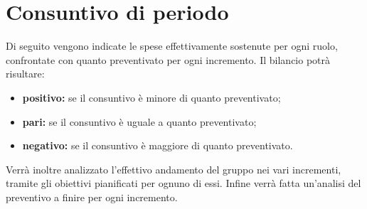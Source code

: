 \section{Consuntivo di periodo}

Di seguito vengono indicate le spese effettivamente sostenute per ogni ruolo, confrontate con quanto preventivato per ogni incremento. Il bilancio potrà risultare:

\begin{itemize}
\item \textbf{positivo:} se il consuntivo è minore di quanto preventivato;
\item \textbf{pari:} se il consuntivo è uguale a quanto preventivato;
\item \textbf{negativo:} se il consuntivo è maggiore di quanto preventivato.
\end{itemize}

Verrà inoltre analizzato l'effettivo andamento del gruppo nei vari incrementi, tramite gli obiettivi pianificati per ognuno di essi. Infine verrà fatta un'analisi del preventivo a finire per ogni incremento.




